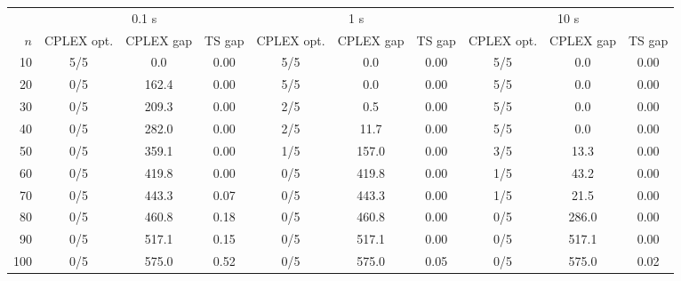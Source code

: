 \begin{tabular}{rccccccccc}
\toprule
& \multicolumn{3}{c}{0.1 s} & \multicolumn{3}{c}{1 s} & \multicolumn{3}{c}{10 s} \\
\cmidrule(lr){2-4} \cmidrule(lr){5-7} \cmidrule(lr){8-10}
$n$ & CPLEX opt. & CPLEX gap & TS gap& CPLEX opt. & CPLEX gap & TS gap& CPLEX opt. & CPLEX gap & TS gap \\
\midrule
10 & 5/5 & 0.0 & 0.00 & 5/5 & 0.0 & 0.00 & 5/5 & 0.0 & 0.00 \\
20 & 0/5 & 162.4 & 0.00 & 5/5 & 0.0 & 0.00 & 5/5 & 0.0 & 0.00 \\
30 & 0/5 & 209.3 & 0.00 & 2/5 & 0.5 & 0.00 & 5/5 & 0.0 & 0.00 \\
40 & 0/5 & 282.0 & 0.00 & 2/5 & 11.7 & 0.00 & 5/5 & 0.0 & 0.00 \\
50 & 0/5 & 359.1 & 0.00 & 1/5 & 157.0 & 0.00 & 3/5 & 13.3 & 0.00 \\
60 & 0/5 & 419.8 & 0.00 & 0/5 & 419.8 & 0.00 & 1/5 & 43.2 & 0.00 \\
70 & 0/5 & 443.3 & 0.07 & 0/5 & 443.3 & 0.00 & 1/5 & 21.5 & 0.00 \\
80 & 0/5 & 460.8 & 0.18 & 0/5 & 460.8 & 0.00 & 0/5 & 286.0 & 0.00 \\
90 & 0/5 & 517.1 & 0.15 & 0/5 & 517.1 & 0.00 & 0/5 & 517.1 & 0.00 \\
100 & 0/5 & 575.0 & 0.52 & 0/5 & 575.0 & 0.05 & 0/5 & 575.0 & 0.02 \\
\bottomrule
\end{tabular}
